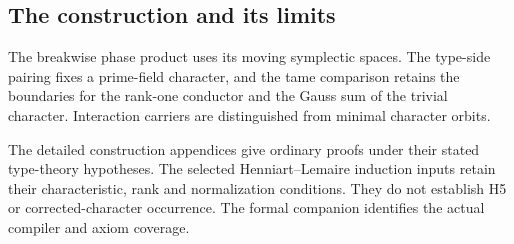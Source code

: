\subsection*{The construction and its limits}
The breakwise phase product uses its moving symplectic spaces. The type-side
pairing fixes a prime-field character, and the tame comparison retains the
boundaries for the rank-one conductor and the Gauss sum of the trivial character. Interaction
carriers are distinguished from minimal character orbits.

The detailed construction appendices give ordinary proofs under their stated
type-theory hypotheses. The selected Henniart--Lemaire induction inputs
\cite{HenniartLemaire2011} retain their characteristic, rank and normalization
conditions. They do not establish H5 or corrected-character occurrence.
The formal companion identifies the actual compiler and axiom coverage.

\endgroup

